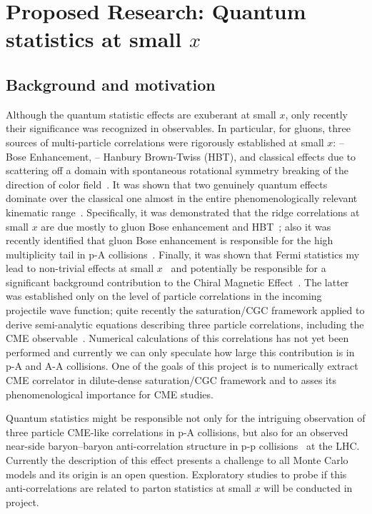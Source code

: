 \section{Proposed Research: Quantum statistics at small $x$}
    \label{sec:p3}

    \vspace{0.5em}
    \subsection{Background and motivation}
    \label{sec:p3b}
	Although the quantum statistic effects are exuberant at small $x$, 
	only recently their significance was recognized in observables. 
	In particular, 
	for gluons, three sources of multi-particle  correlations were rigorously established at 
	small $x$: -- Bose Enhancement, -- Hanbury Brown-Twiss (HBT), and classical effects due to 
	scattering off a domain with spontaneous rotational symmetry breaking of the direction of 
	color field~\cite{Dumitru:2014yza,Dumitru:2014vka,Dumitru:2015cfa}. It was shown that two genuinely quantum effects dominate over the classical one 
	almost in the entire phenomenologically relevant kinematic range~\cite{Kovner:2018azs}.
	Specifically, it was demonstrated that the ridge correlations at small $x$ are 
	due mostly to gluon Bose enhancement and 
	HBT~\cite{Kovchegov:2013ewa,Kovchegov:2012nd,Altinoluk:2015uaa,Altinoluk:2018ogz,Kovner:2018fxj,Kovchegov:2018jun};
	also  it was recently identified 
	that gluon Bose enhancement is responsible for the high multiplicity tail in p-A collisions~\cite{Kovner:2018azs}. 
	Finally, it was shown that Fermi statistics my lead to non-trivial effects at small $x$~\cite{Altinoluk:2016vax,Kovner:2017ssr,Kovner:2018vec} 
and potentially be responsible for a significant background contribution to the Chiral Magnetic Effect~\cite{Kovner:2017gab}. 
	The latter was established only on the level of particle correlations in the incoming projectile wave function; 
	quite recently the saturation/CGC framework applied to derive semi-analytic equations describing 
	three particle correlations, including the CME observable~\cite{Martinez:2018tuf}. Numerical calculations of this 
	correlations has not yet been performed and currently we can only speculate how large 
	this contribution is in p-A and A-A collisions. One of the goals of this project is to 
	numerically extract CME correlator in dilute-dense saturation/CGC framework and to asses its phenomenological importance 
	for CME studies. 

	Quantum statistics might be responsible not only for the intriguing observation of three particle CME-like correlations 
	in p-A collisions, but also for an observed near-side baryon--baryon anti-correlation structure in p-p 
	collisions~\cite{Adam:2016iwf} at the LHC. Currently the description of this effect presents a challenge 
	to all Monte Carlo models and its origin is an open question. Exploratory studies to probe if this anti-correlations are 
    related to parton statistics at small $x$ will be conducted in project.  


